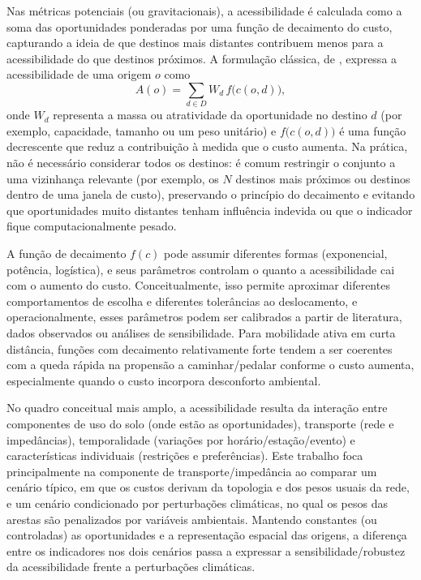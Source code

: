 Nas métricas potenciais (ou gravitacionais), a acessibilidade é calculada como a soma das oportunidades ponderadas por uma função de decaimento do custo, capturando a ideia de que destinos mais distantes contribuem menos para a acessibilidade do que destinos próximos. A formulação clássica, de \cite{Hansen1959}, expressa a acessibilidade de uma origem $o$ como
\begin{equation}
A(o) = \sum_{d \in D} W_d \, f\!\big(c(o,d)\big),
\end{equation}
onde $W_d$ representa a massa ou atratividade da oportunidade no destino $d$ (por exemplo, capacidade, tamanho ou um peso unitário) e $f\!\big(c(o,d)\big)$ é uma função decrescente que reduz a contribuição à medida que o custo aumenta. Na prática, não é necessário considerar todos os destinos: é comum restringir o conjunto a uma vizinhança relevante (por exemplo, os $N$ destinos mais próximos ou destinos dentro de uma janela de custo), preservando o princípio do decaimento e evitando que oportunidades muito distantes tenham influência indevida ou que o indicador fique computacionalmente pesado.

A função de decaimento $f(c)$ pode assumir diferentes formas (exponencial, potência, logística), e seus parâmetros controlam o quanto a acessibilidade cai com o aumento do custo. Conceitualmente, isso permite aproximar diferentes comportamentos de escolha e diferentes tolerâncias ao deslocamento, e operacionalmente, esses parâmetros podem ser calibrados a partir de literatura, dados observados ou análises de sensibilidade. Para mobilidade ativa em curta distância, funções com decaimento relativamente forte tendem a ser coerentes com a queda rápida na propensão a caminhar/pedalar conforme o custo aumenta, especialmente quando o custo incorpora desconforto ambiental.

No quadro conceitual mais amplo, a acessibilidade resulta da interação entre componentes de uso do solo (onde estão as oportunidades), transporte (rede e impedâncias), temporalidade (variações por horário/estação/evento) e características individuais (restrições e preferências). Este trabalho foca principalmente na componente de transporte/impedância ao comparar um cenário típico, em que os custos derivam da topologia e dos pesos usuais da rede, e um cenário condicionado por perturbações climáticas, no qual os pesos das arestas são penalizados por variáveis ambientais. Mantendo constantes (ou controladas) as oportunidades e a representação espacial das origens, a diferença entre os indicadores nos dois cenários passa a expressar a sensibilidade/robustez da acessibilidade frente a perturbações climáticas.

